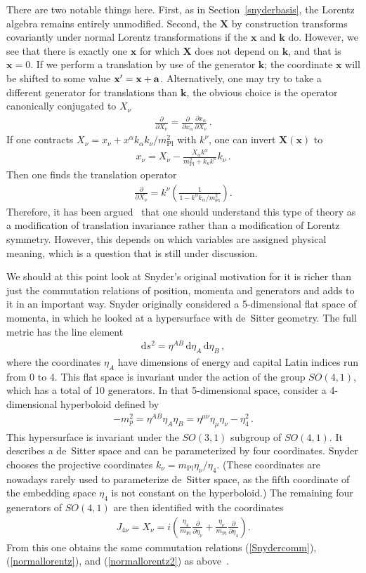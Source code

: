 \documentclass{article}
\def\beqn{\begin{eqnarray}}
\def\eeqn{\end{eqnarray}}
\begin{document}
There are two notable things here. First, as in Section~\ref{snyderbasis},
 the Lorentz algebra remains entirely unmodified. Second, the $\mathbf{X}$ by construction 
transforms covariantly under normal Lorentz transformations if the $\mathbf{x}$ and $\mathbf{k}$ do. However, we see 
that there is exactly one $\mathbf{x}$ for which $\mathbf{X}$
does not depend on $\mathbf{k}$, and that is $\mathbf{x} = 0$. If we perform a translation by use of the generator $\mathbf{k}$; the
coordinate $\mathbf{x}$ will be shifted to some value $\mathbf{x}' = \mathbf{x}+{\bf a}$. 
Alternatively, one may try to take a different generator for
translations than $\mathbf{k}$, the obvious choice is the operator canonically conjugated to $X_\nu$
\beqn
\frac{\partial}{\partial X_\nu} = \frac{\partial}{\partial x_\alpha}\frac{\partial x_\alpha}{\partial X_\nu} \,.
\eeqn
If one contracts $X_\nu = x_\nu + x^\alpha k_\alpha k_\nu /m_{\mathrm{Pl}}^2$ with $k^\nu$, one can invert $\mathbf{X}(\mathbf{x})$ to
\beqn
x_\nu = X_\nu - \frac{X_\alpha k^\alpha}{m_{\mathrm{Pl}}^2 + k_\kappa k^\kappa} k_\nu \,. 
\eeqn
Then one finds the translation operator
\beqn
\frac{\partial}{\partial X_\nu} = k^\nu \left( \frac{1}{1 - k^\alpha k_\alpha/ m_{\mathrm{Pl}}^2}\right) .
\eeqn
Therefore, it has been argued~\cite{Mignemi:2008kn} that one should understand this type of theory 
as a modification of translation invariance rather than a modification of Lorentz symmetry. However, this
depends on which variables are assigned physical meaning, which is a question that is still under discussion.

We should at this point look at Snyder's original motivation for it is richer than just the
commutation relations of position, momenta and generators and adds to it in an important way. Snyder originally considered a 5-dimensional
flat space of momenta, in which he looked at a hypersurface with de~Sitter geometry. The full metric
has the line element
\beqn
\mathrm{d}s^2 = \eta^{AB} \, \mathrm{d}\eta_A \, \mathrm{d}\eta_B \,,
\eeqn
where the coordinates $\eta_A$ have dimensions of energy and capital Latin indices run from 0 to 4.
This flat space is invariant under the action of the group $SO(4,1)$, which has a total of 10 generators. In that
5-dimensional space, consider a 4-dimensional hyperboloid defined by
\beqn
- m_p^2 = \eta^{AB} \eta_A \eta_B = \eta^{\mu \nu} \eta_\mu \eta_\nu - \eta_4^2 \,.
\eeqn
This hypersurface is invariant under the $SO(3,1)$ subgroup of $SO(4,1)$. It describes a de~Sitter space and can be parameterized by 
four coordinates. Snyder
chooses the projective coordinates $k_\nu = m_{\mathrm{Pl}} \eta_\nu/\eta_4$. (These coordinates are nowadays rarely used to
parameterize de~Sitter space, as the fifth coordinate of the embedding space $\eta_4$ is not constant on
the hyperboloid.) The remaining four generators of 
$SO(4,1)$ are then identified with the coordinates
\beqn
J_{4\nu} = X_\nu = i \left( \frac{\eta_4}{m_{\mathrm{Pl}}} \frac{\partial}{\partial \eta_\nu} +  \frac{\eta_\nu}{m_{\mathrm{Pl}}} \frac{\partial}{\partial \eta_4} \right) .
\eeqn
From this one obtains the same commutation relations (\ref{Snydercomm}), (\ref{normallorentz}), and (\ref{normallorentz2}) as above~\cite{Blaut:2003wg}.
\end{document}
